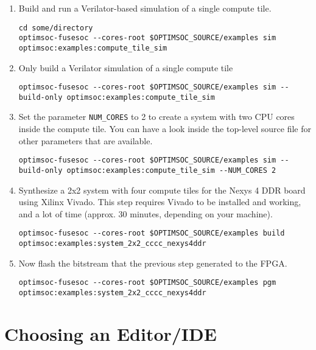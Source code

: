 \begin{enumerate}
\item Build and run a Verilator-based simulation of a single compute tile.
\begin{lstlisting}
cd some/directory
optimsoc-fusesoc --cores-root $OPTIMSOC_SOURCE/examples sim optimsoc:examples:compute_tile_sim
\end{lstlisting}

\item Only build a Verilator simulation of a single compute tile
\begin{lstlisting}
optimsoc-fusesoc --cores-root $OPTIMSOC_SOURCE/examples sim --build-only optimsoc:examples:compute_tile_sim
\end{lstlisting}

\item Set the parameter \verb|NUM_CORES| to 2 to create a system with two CPU cores inside the compute tile.
  You can have a look inside the top-level source file  for other parameters that are available.
\begin{lstlisting}
optimsoc-fusesoc --cores-root $OPTIMSOC_SOURCE/examples sim --build-only optimsoc:examples:compute_tile_sim --NUM_CORES 2
\end{lstlisting}

\item Synthesize a 2x2 system with four compute tiles for the Nexys 4 DDR board using Xilinx Vivado.
This step requires Vivado to be installed and working, and a lot of time (approx. 30 minutes, depending on your machine).
\begin{lstlisting}
optimsoc-fusesoc --cores-root $OPTIMSOC_SOURCE/examples build optimsoc:examples:system_2x2_cccc_nexys4ddr
\end{lstlisting}

\item Now flash the bitstream that the previous step generated to the FPGA.
\begin{lstlisting}
optimsoc-fusesoc --cores-root $OPTIMSOC_SOURCE/examples pgm optimsoc:examples:system_2x2_cccc_nexys4ddr
\end{lstlisting}
\end{enumerate}


\section{Choosing an Editor/IDE}


